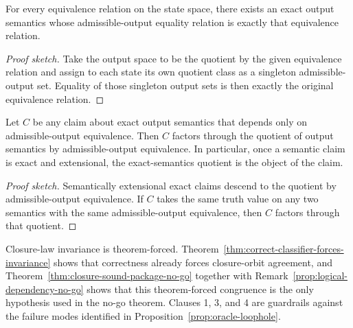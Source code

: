 \begin{corollary}\label{cor:every-state-equivalence-relation-is-realizable-as-exact-output-semantics}
For every equivalence relation on the state space, there exists an exact output semantics whose admissible-output equality relation is exactly that equivalence relation.
\end{corollary}

\begin{proof}[Proof sketch]
Take the output space to be the quotient by the given equivalence relation and assign to each state its own quotient class as a singleton admissible-output set. Equality of those singleton output sets is then exactly the original equivalence relation.
\end{proof}

\begin{proposition}\label{prop:semantically-extensional-claims-factor-through-the-quotient}
Let $C$ be any claim about exact output semantics that depends only on admissible-output equivalence. Then $C$ factors through the quotient of output semantics by admissible-output equivalence. In particular, once a semantic claim is exact and extensional, the exact-semantics quotient is the object of the claim.
\end{proposition}

\begin{proof}[Proof sketch]
Semantically extensional exact claims descend to the quotient by admissible-output equivalence. If $C$ takes the same truth value on any two semantics with the same admissible-output equivalence, then $C$ factors through that quotient.
\end{proof}

Closure-law invariance is theorem-forced. Theorem~\ref{thm:correct-classifier-forces-invariance} shows that correctness already forces closure-orbit agreement, and Theorem~\ref{thm:closure-sound-package-no-go} together with Remark~\ref{prop:logical-dependency-no-go} shows that this theorem-forced congruence is the only hypothesis used in the no-go theorem. Clauses 1, 3, and 4 are guardrails against the failure modes identified in Proposition~\ref{prop:oracle-loophole}.
